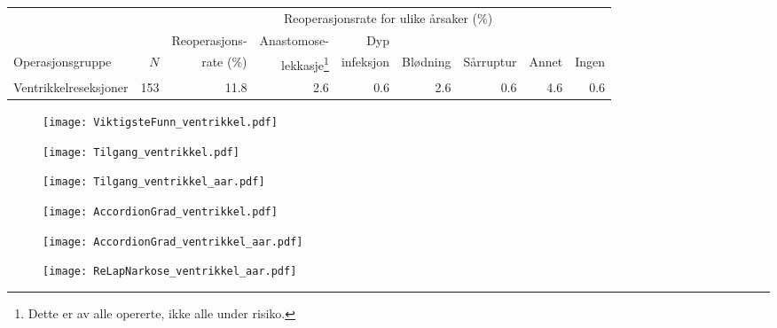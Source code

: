 \documentclass[norsk,a4paper]{article}\usepackage[]{graphicx}\usepackage[]{color}
\begin{document}
\begin{table}[htb]
\begin{minipage}{\textwidth}
\centering
\begin{tabular}{lrrrrrrrr}
  \toprule
  & & & \multicolumn{4}{c}{Reoperasjonsrate for ulike årsaker (\%)} \\
 \cline{4-9} 
 & & Reoperasjons- & Anastomose- & Dyp &&&&  \\
 Operasjonsgruppe & $N$ & rate (\%) & lekkasje\footnote[2]{Dette er av alle opererte, ikke
alle under risiko.} & infeksjon & Blødning & Sårruptur & Annet & Ingen \\
 \midrule
Ventrikkelreseksjoner & 153 & 11.8 & 2.6 & 0.6 & 2.6 & 0.6 & 4.6 & 0.6 \\ 
   \bottomrule
\end{tabular}

\end{minipage}
\end{table}




\begin{figure}[ht]
\centering
\texttt{[image: ViktigsteFunn\_ventrikkel.pdf]}
\caption{}
\end{figure}

\begin{figure}[ht]
\centering
\texttt{[image: Tilgang\_ventrikkel.pdf]}
\caption{}
\end{figure}

\begin{figure}[ht]
\centering
\texttt{[image: Tilgang\_ventrikkel\_aar.pdf]}
\caption{}
\end{figure}

\begin{figure}[ht]
\centering
\texttt{[image: AccordionGrad\_ventrikkel.pdf]}
\caption{}
\end{figure}

\begin{figure}[ht]
\centering
\texttt{[image: AccordionGrad\_ventrikkel\_aar.pdf]}
\caption{}
\end{figure}

\begin{figure}[ht]
\centering
\texttt{[image: ReLapNarkose\_ventrikkel\_aar.pdf]}
\caption{}
\end{figure}
\end{document}
